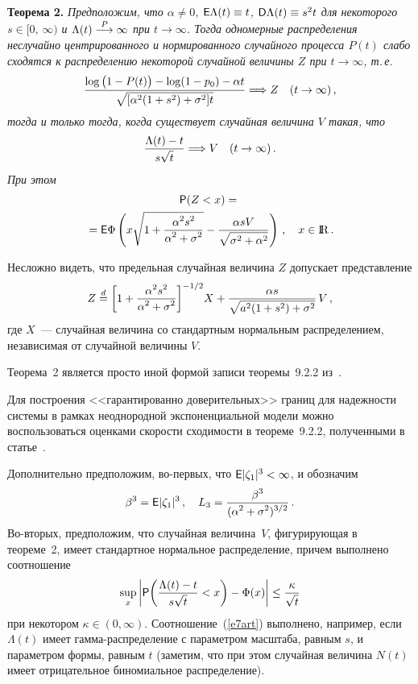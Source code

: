 \begin{multicols}{2}
\smallskip

\noindent
{\textbf{Теорема 2.}} {\it Предположим, что $\alpha\neq 0$, ${\sf
E}\Lambda(t) \equiv t$,  ${\sf D}\Lambda(t)\equiv s^2t$ для
некоторого $s\in[0,\,\infty)$ и $\Lambda(t)\stackrel{P}{\longrightarrow}\infty$ при $t\to\infty$.
Тогда одномерные распределения неслучайно центрированного и
нормированного случайного процесса $P(t)$ слабо сходятся к
распределению некоторой случайной величины $Z$ при $t\to\infty$,
т.\,е.\
$$
\displaystyle\frac{\displaystyle \log \big(1-P(t)\big)-\log (1-p_0)-\alpha
t\mathstrut}{\displaystyle \sqrt{[\alpha^2(1+s^2)+\sigma^2]t}\mathstrut}\Longrightarrow Z\ \ \
(t\to\infty)\,,
$$
тогда и только тогда, когда существует случайная величина $V$
такая, что
$$
\displaystyle\frac{\displaystyle \Lambda(t)-t\mathstrut}{\displaystyle s\sqrt t\mathstrut}\Longrightarrow V\ \ \ (t\to\infty)\,.
$$
При этом}
\begin{multline*}
{\sf P}(Z<x)={}\\
{}={\sf
E}\Phi\left(x\sqrt{1+\displaystyle\frac{\displaystyle \alpha^2s^2\mathstrut}{\displaystyle \alpha^2+\sigma^2\mathstrut}}-\displaystyle\frac{\displaystyle \alpha
sV\mathstrut}{\displaystyle \sqrt{\sigma^2+\alpha^2}\mathstrut}\right )\,,\ \ \ x\in{\rm I\hspace{-0.7mm}\rm R}\,.
\end{multline*}

\smallskip

Несложно видеть, что предельная случайная величина $Z$ допускает
представление
$$
Z\stackrel{d}{=}
\bigg[1+\displaystyle\frac{\displaystyle \alpha^2s^2\mathstrut}{\displaystyle \alpha^2+\sigma^2\mathstrut}\bigg]^{-1/2}
X+\displaystyle\frac{\displaystyle \alpha s\mathstrut}{\displaystyle \sqrt{a^2(1+s^2)+\sigma^2}\mathstrut}\, V\,,
$$
где $X$~--- случайная величина со стандартным нормальным
распределением, независимая от случайной величины $V$.

Теорема~2 является просто иной формой записи теоремы~9.2.2 из~\cite{8art}.

\smallskip

Для построения <<гарантированно доверительных>> границ для
надежности системы в рамках неоднородной экспоненциальной модели
можно воспользоваться оценками скорости сходимости в теореме~9.2.2,
полученными в статье~\cite{10art}.

Дополнительно предположим, во-первых, что ${\sf E}|\zeta_1|^3<\infty$,
и обозначим
$$
\beta^3 = {\sf E}|\zeta_1|^3\,,\ \ \ L_3 =
\displaystyle\frac{\displaystyle \beta^3\mathstrut}{\displaystyle (\alpha^2+\sigma^2)^{3/2}\mathstrut}\,.
$$
Во-вторых, предположим, что случайная величина~$V$, фигурирующая в
теореме~2, имеет стандартное нормальное распределение, причем
выполнено соотношение
\begin{equation}
\sup_x\bigg|{\sf P}\bigg(\displaystyle\frac{\displaystyle \Lambda(t)-t\mathstrut}{\displaystyle s\sqrt
t\mathstrut}<x\bigg)-\Phi(x)\bigg|\le\displaystyle\frac{\displaystyle \kappa\mathstrut}{\displaystyle \sqrt{t}\mathstrut}
\label{e7art}
\end{equation}
при некотором $\kappa\in(0,\infty)$. Соотношение~(\ref{e7art}) выполнено,
например, если $\Lambda(t)$ имеет гамма-рас\-пре\-де\-ление с параметром
масштаба, равным $s$, и параметром формы, равным $t$ (заметим, что
при этом случайная величина $N(t)$ имеет отрицательное
биномиальное распределение).


\end{multicols}
